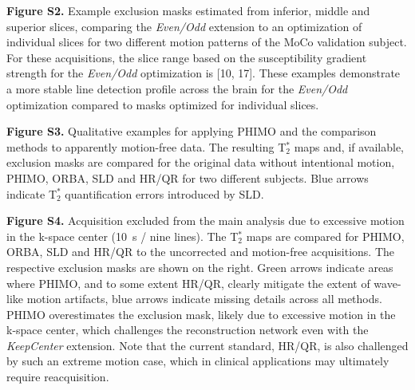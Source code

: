 \documentclass[AMA,STIX2COL]{MRM}
\newcommand{\tstar}[1]{{T$_2^*$}}
\begin{document}
\noindent
\textbf{Figure S2.}
{Example exclusion masks estimated from inferior, middle and superior slices, comparing the \textit{Even/Odd} extension to an optimization of individual slices for two different motion patterns of the MoCo validation subject. For these acquisitions, the slice range based on the susceptibility gradient strength for the \textit{Even/Odd} optimization is [10, 17].
These examples demonstrate a more stable line detection profile across the brain for the \textit{Even/Odd} optimization compared to masks optimized for individual slices. }

\noindent
\textbf{Figure S3.}
{Qualitative examples for applying PHIMO and the comparison methods to apparently motion-free data. The resulting \tstar{} maps and, if available, exclusion masks are compared for the original data without intentional motion, PHIMO, ORBA, SLD and HR/QR for two different subjects.
Blue arrows indicate \tstar{} quantification errors introduced by SLD.}

\noindent
\textbf{Figure S4.}
{Acquisition excluded from the main analysis due to excessive motion in the k-space center (10~s / nine lines). 
The \tstar{} maps are compared for PHIMO, ORBA, SLD and HR/QR to the uncorrected and motion-free acquisitions. The respective exclusion masks are shown on the right.
Green arrows indicate areas where PHIMO, and to some extent HR/QR, clearly mitigate the extent of wave-like motion artifacts, blue arrows indicate missing details across all methods. 
PHIMO overestimates the exclusion mask, likely due to excessive motion in the k-space center, which challenges the reconstruction network even with the \textit{KeepCenter} extension. Note that the current standard, HR/QR, is also challenged by such an extreme motion case, which in clinical applications may ultimately require reacquisition.}


\appendix

\clearpage


\end{document}
